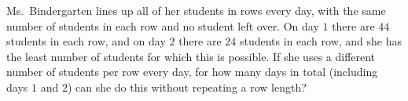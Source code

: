 Ms.\ Bindergarten lines up all of her students in rows every day, with the same number of students in each row and no student left over. On day $1$ there are $44$ students in each row, and on day $2$ there are $24$ students in each row, and she has the least number of students for which this is possible. If she uses a different number of students per row every day, for how many days in total (including days $1$ and $2$) can she do this without repeating a row length?

